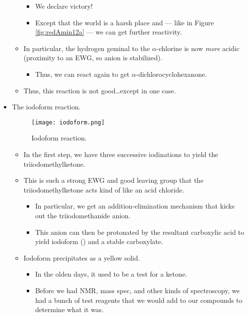 \documentclass[../notes.tex]{subfiles}
\begin{document}
\begin{itemize}
\begin{itemize}
        \begin{itemize}
            \item We declare victory!
            \item Except that the world is a harsh place and --- like in Figure \ref{fig:redAmin12a} --- we can get further reactivity.
        \end{itemize}
        \item In particular, the hydrogen geminal to the $\alpha$-chlorine is now \emph{more} acidic (proximity to an EWG, so anion is stabilized).
        \begin{itemize}
            \item Thus, we can react again to get $\alpha$-dichlorocyclohexanone.
        \end{itemize}
        \item Thus, this reaction is not good\dots except in one case.
    \end{itemize}
    \pagebreak
    \item The iodoform reaction.
    \begin{figure}[h!]
        \centering
        \texttt{[image: iodoform.png]}
        \caption{Iodoform reaction.}
        \label{fig:iodoform}
    \end{figure}
    \begin{itemize}
        \item In the first step, we have three successive iodinations to yield the triiodomethylketone.
        \item This is such a strong EWG and good leaving group that the triiodomethylketone acts kind of like an acid chloride.
        \begin{itemize}
            \item In particular, we get an addition-elimination mechanism that kicks out the triiodomethanide anion.
            \item This anion can then be protonated by the resultant carboxylic acid to yield iodoform () and a stable carboxylate.
        \end{itemize}
        \item Iodoform precipitates as a yellow solid.
        \begin{itemize}
            \item In the olden days, it used to be a test for a ketone.
            \item Before we had NMR, mass spec, and other kinds of spectroscopy, we had a bunch of test reagents that we would add to our compounds to determine what it was.

\end{itemize}
\end{itemize}
\end{itemize}
\end{document}
